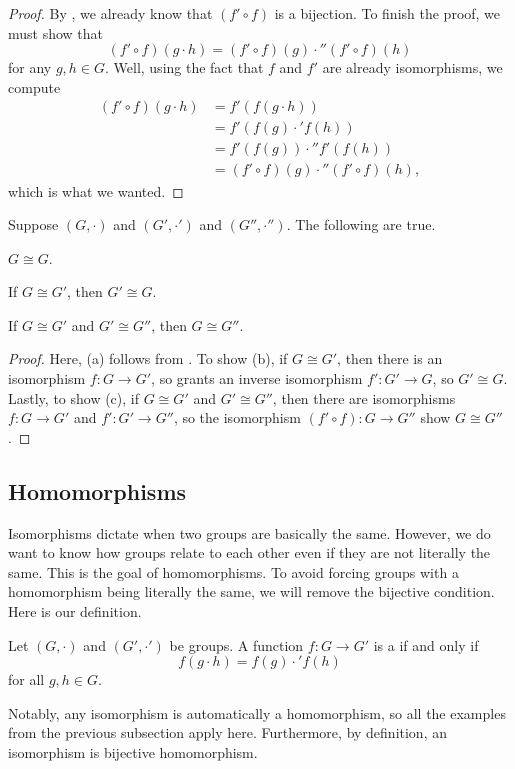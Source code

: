 \documentclass[../main.tex]{subfiles}
\begin{document}
\begin{proof}
    By , we already know that $(f'\circ f)$ is a bijection. To finish the proof, we must show that
    \[(f'\circ f)(g\cdot h)=(f'\circ f)(g)\cdot''(f'\circ f)(h)\]
    for any $g,h\in G$. Well, using the fact that $f$ and $f'$ are already isomorphisms, we compute
    \begin{align*}
        (f'\circ f)(g\cdot h) &= f'(f(g\cdot h)) \\
        &= f'(f(g)\cdot'f(h)) \\
        &= f'(f(g))\cdot''f'(f(h)) \\
        &= (f'\circ f)(g)\cdot''(f'\circ f)(h),
    \end{align*}
    which is what we wanted.
\end{proof}
\begin{proposition}
    Suppose $(G,\cdot)$ and $(G',\cdot')$ and $(G'',\cdot'')$. The following are true.
    \begin{listalph}
        \item $G\cong G$.
        \item If $G\cong G'$, then $G'\cong G$.
        \item If $G\cong G'$ and $G'\cong G''$, then $G\cong G''$.
    \end{listalph}
\end{proposition}
\begin{proof}
    Here, (a) follows from . To show (b), if $G\cong G'$, then there is an isomorphism $f\colon G\to G'$, so  grants an inverse isomorphism $f'\colon G'\to G$, so $G'\cong G$. Lastly, to show (c), if $G\cong G'$ and $G'\cong G''$, then there are isomorphisms $f\colon G\to G'$ and $f'\colon G'\to G''$, so the isomorphism $(f'\circ f)\colon G\to G''$ show $G\cong G''$.
\end{proof}

\subsection{Homomorphisms}
Isomorphisms dictate when two groups are basically the same. However, we do want to know how groups relate to each other even if they are not literally the same. This is the goal of homomorphisms. To avoid forcing groups with a homomorphism being literally the same, we will remove the bijective condition. Here is our definition.
\begin{definition}[homomorphism]
    Let $(G,\cdot)$ and $(G',\cdot')$ be groups. A function $f\colon G\to G'$ is a  if and only if
    \[f(g\cdot h)=f(g)\cdot'f(h)\]
    for all $g,h\in G$.
\end{definition}
Notably, any isomorphism is automatically a homomorphism, so all the examples from the previous subsection apply here. Furthermore, by definition, an isomorphism is bijective homomorphism.
\end{document}

